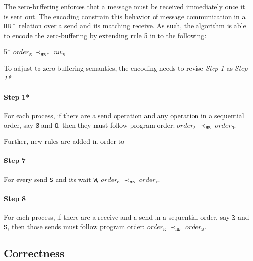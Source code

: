 The zero-buffering enforces that a message must be received immediately once it is sent out. The encoding constrain this behavior of message communication in a $\mathtt{HB*}$ relation over a send and its matching receive. As such, the algorithm is able to encode the zero-buffering by extending rule 5 in  to the following:
\begin{compactenum}
\item[5*] $\mathit{order}_{\mathtt{S}}\ \mathrm{\prec_\mathtt{HB*}}\ \mathit{nw}_{\mathtt{R}}$
\end{compactenum}

To adjust to zero-buffering semantics, the encoding needs to revise \emph{Step 1} as \emph{Step 1*}.

\paragraph*{Step 1*} For each process, if there are a send operation and any operation in a sequential order, say $\mathtt{S}$ and $\mathtt{O}$, then 
they must follow program order: $\mathit{order}_\mathtt{S}$
$\prec_\mathtt{HB}$ $\mathit{order}_\mathtt{O}$. 

Further, new rules are added in order to 

\paragraph*{Step 7} For every send \texttt{S} and its wait \texttt{W}, $\mathit{order}_\mathtt{S}$
$\prec_\mathtt{HB}$ $\mathit{order}_\mathtt{W}$.

\paragraph*{Step 8} For each process, if there are a receive and a send in a sequential order, say $\mathtt{R}$ and $\mathtt{S}$, then those
sends must follow program order: $\mathit{order}_\mathtt{R}$
$\prec_\mathtt{HB}$ $\mathit{order}_\mathtt{S}$. 

\subsection{Correctness}

